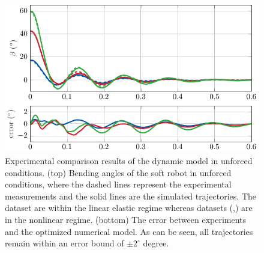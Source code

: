 %
\begin{figure}[!t]
  \centering
  \includegraphics*{./pdf/thesis-figure-4-16.pdf}
  \vspace{-1mm}
  \caption{Experimental comparison results of the
  dynamic model in unforced conditions. (top) Bending angles of the soft robot in unforced conditions,  where the dashed lines represent the experimental measurements and the solid lines are the simulated trajectories. The dataset  are within the linear elastic regime whereas datasets (,) are in the nonlinear regime. (bottom) The error between experiments and the optimized numerical model. As can be seen, all trajectories remain within an error bound of $\pm2^\circ$ degree. }
  \label{fig:C2:compare_states}
\end{figure}
%

